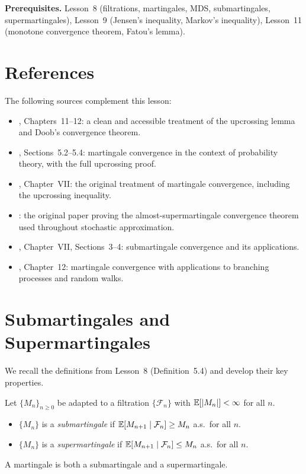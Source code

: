 \documentclass[11pt,a4paper]{article}
\begin{document}
\medskip
\noindent\textbf{Prerequisites.}
Lesson~8 (filtrations, martingales, MDS, submartingales,
supermartingales), Lesson~9 (Jensen's inequality, Markov's
inequality), Lesson~11 (monotone convergence theorem, Fatou's
lemma).


\section{References}
\label{sec:references}

The following sources complement this lesson:
\begin{itemize}[nosep]
  \item \citet{williams1991}, Chapters~11--12: a clean and
    accessible treatment of the upcrossing lemma and Doob's
    convergence theorem.
  \item \citet{durrett2019}, Sections~5.2--5.4: martingale
    convergence in the context of probability theory, with the
    full upcrossing proof.
  \item \citet{doob1953}, Chapter~VII: the original treatment of
    martingale convergence, including the upcrossing inequality.
  \item \citet{robbins1971}: the original paper proving the
    almost-supermartingale convergence theorem used throughout
    stochastic approximation.
  \item \citet{shiryaev2016}, Chapter~VII, Sections~3--4:
    submartingale convergence and its applications.
  \item \citet{grimmett2001}, Chapter~12: martingale convergence
    with applications to branching processes and random walks.
\end{itemize}


\section{Submartingales and Supermartingales}
\label{sec:sub_super}

We recall the definitions from Lesson~8 (Definition~5.4) and
develop their key properties.

\begin{definition}
\label{def:sub_super}
Let $\{M_n\}_{n \geq 0}$ be adapted to a filtration
$\{\mathcal{F}_n\}$ with $\mathbb{E}[|M_n|] < \infty$ for all $n$.
\begin{itemize}[nosep]
  \item $\{M_n\}$ is a \emph{submartingale} if
    $\mathbb{E}[M_{n+1} \mid \mathcal{F}_n] \geq M_n$ a.s.\ for all $n$.
  \item $\{M_n\}$ is a \emph{supermartingale} if
    $\mathbb{E}[M_{n+1} \mid \mathcal{F}_n] \leq M_n$ a.s.\ for all $n$.
\end{itemize}
A martingale is both a submartingale and a supermartingale.
\end{definition}
\end{document}
